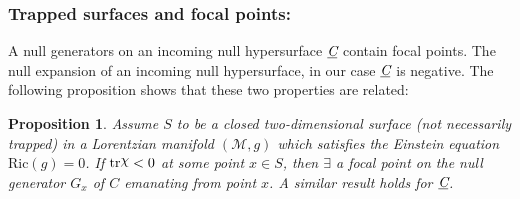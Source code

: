 \documentclass[12pt, a4paper]{report}
\theoremstyle{bfnote}
\newtheorem{proposition}{Proposition}[section]
\newcommand{\underit}[1]{\textit{\underbar{#1}}}
\newcommand{\chits}{\raisebox{0.5ex}{$\chi$}} %
\begin{document}
\subsubsection{Trapped surfaces and focal points:}
A null generators on an incoming null hypersurface $\underit{C}$ contain focal
points. The null expansion of an incoming null hypersurface, in our case
$\underit{C}$ is negative. The following proposition shows that these two
properties are related:
\begin{proposition}{\label{PropFocalPointTS}}
    Assume $S$ to be a closed two-dimensional surface (not necessarily
    trapped) in a Lorentzian manifold $\left(\mathcal{M}, g\right)$ which
    satisfies the Einstein equation $\mathrm{Ric}\left(g\right) = 0$. If
    $\mathrm{tr}\chits < 0$ at some point $x\in S$, then $\exists$ a focal point
    on the null generator $G_x$ of $C$ emanating from point $x$. A similar
    result holds for $\underit{C}$.
\end{proposition}
\end{document}
